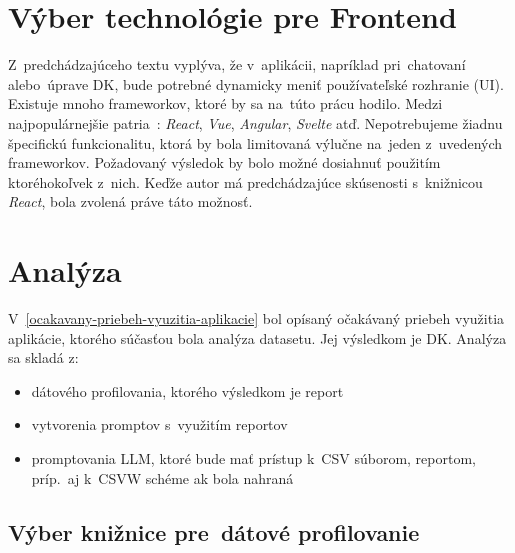 \section{Výber technológie pre Frontend}

Z~predchádzajúceho textu vyplýva, že v~aplikácii, napríklad pri~chatovaní alebo~úprave DK, bude potrebné dynamicky meniť používateľské rozhranie (UI). Existuje mnoho frameworkov, ktoré by sa na~túto prácu hodilo. Medzi najpopulárnejšie patria~\cite{popular-frontend-frameworks}: \textit{React}, \textit{Vue}, \textit{Angular}, \textit{Svelte} atď. Nepotrebujeme žiadnu špecifickú funkcionalitu, ktorá by bola limitovaná výlučne na~jeden z~uvedených frameworkov. Požadovaný výsledok by bolo možné dosiahnuť použitím ktoréhokoľvek z~nich. Keďže autor má predchádzajúce skúsenosti s~knižnicou \textit{React}, bola zvolená práve táto možnosť.

\section{Analýza}

V~\ref{ocakavany-priebeh-vyuzitia-aplikacie} bol opísaný očakávaný priebeh využitia aplikácie, ktorého súčasťou bola analýza datasetu. Jej výsledkom je DK. Analýza sa skladá z:
\begin{itemize}
\item dátového profilovania, ktorého výsledkom je report
\item vytvorenia promptov s~využitím reportov
\item promptovania LLM, ktoré bude mať prístup k~CSV súborom, reportom, príp.~aj k~CSVW schéme ak bola nahraná
\end{itemize}

\subsection{Výber knižnice pre~dátové profilovanie}


